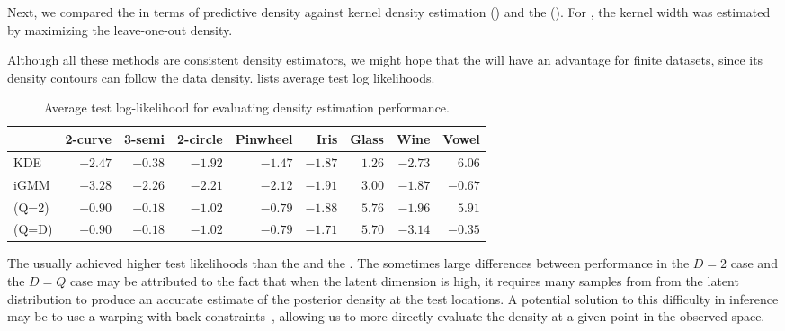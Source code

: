 Next, we compared the \iwmm{} in terms of predictive density against kernel density estimation (\KDE{}) and the (\iGMM{}).
For \KDE{}, the kernel width was estimated by maximizing the leave-one-out density.

Although all these methods are consistent density estimators, we might hope that the \iwmm{} will have an advantage for finite datasets, since its density contours can follow the data density.
%
 lists average test log likelihoods.
%
\begin{table}[ht!]
\centering
\caption[Predictive log-likelihood comparison]
{Average test log-likelihood for evaluating density estimation performance.}
\label{tab:likelihood}
\begin{tabular}{lrrrrrrrr}
\hline
& 2-curve & 3-semi & 2-circle & Pinwheel & Iris  & Glass  & Wine  & Vowel  \\
\hline 
KDE & $-2.47$ & $-0.38$ & $-1.92$ & $-1.47$ & $\mathbf{-1.87}$ & $1.26$ & $-2.73$ & $\mathbf{6.06}$ \\
iGMM & $-3.28$ & $-2.26$ & $-2.21$ & $-2.12$ & $-1.91$ & $3.00$ & $\mathbf{-1.87}$ & $-0.67$ \\
\iwmm{}(Q=2) & $\mathbf{-0.90}$ & $\mathbf{-0.18}$ & $\mathbf{-1.02}$ & $\mathbf{-0.79}$ & $\mathbf{-1.88}$ & $\mathbf{5.76}$ & $\mathbf{-1.96}$ & $\mathbf{5.91}$ \\
\iwmm{}(Q=D) & $\mathbf{-0.90}$ & $\mathbf{-0.18}$ & $\mathbf{-1.02}$ & $\mathbf{-0.79}$ & $\mathbf{-1.71}$ & $\mathbf{5.70}$ & $-3.14$ & $-0.35$ \\
\hline
\end{tabular}
\end{table}


The \iwmm{} usually achieved higher test likelihoods than the \KDE{} and the \iGMM{}.
%
The sometimes large differences between performance in the $D = 2$ case and the $D = Q$ case may be attributed to the fact that when the latent dimension is high, it requires many samples from from the latent distribution to produce an accurate estimate of the posterior density at the test locations.
A potential solution to this difficulty in inference may be to use a warping with back-constraints~\citep{Lawrence06localdistance}, allowing us to more directly evaluate the density at a given point in the observed space.




